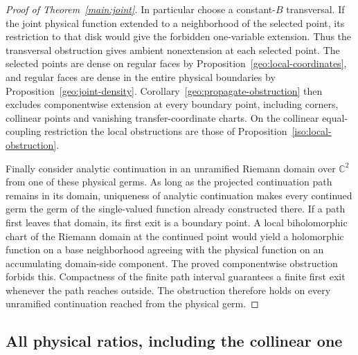 \documentclass[11pt]{article}
\numberwithin{equation}{section}
\theoremstyle{definition}
\newcommand{\C}{\mathbb C}
\begin{document}
\begin{proof}[Proof of Theorem~\ref{main:joint}]
In particular choose a constant-\(B\) transversal. If the joint
physical function extended to a neighborhood of the selected point,
its restriction to that disk would give the forbidden one-variable
extension. Thus the transversal obstruction gives ambient nonextension at
each selected point. The selected points are dense
on regular faces by Proposition~\ref{geo:local-coordinates}, and
regular faces are dense in the entire physical boundaries by
Proposition~\ref{geo:joint-density}. Corollary~\ref{geo:propagate-obstruction}
then excludes componentwise extension at every boundary point,
including corners, collinear points and vanishing transfer-coordinate
charts. On the collinear equal-coupling restriction the local
obstructions are those of Proposition~\ref{iso:local-obstruction}.

Finally consider analytic continuation in an unramified Riemann domain
over \(\C^2\) from one of these physical germs. As long as the
projected continuation path remains in its domain, uniqueness of
analytic continuation makes every continued germ the germ of the
single-valued function already constructed there. If a path first
leaves that domain, its first exit is a boundary point. A local
biholomorphic chart of the Riemann domain at the continued point
would yield a holomorphic function on a base neighborhood agreeing
with the physical function on an accumulating domain-side component.
The proved componentwise obstruction forbids this. Compactness of
the finite path interval guarantees a finite first exit whenever the
path reaches outside. The obstruction therefore holds on every
unramified continuation reached from the physical germ.
\end{proof}

\subsection{All physical ratios, including the collinear one}
\end{document}
